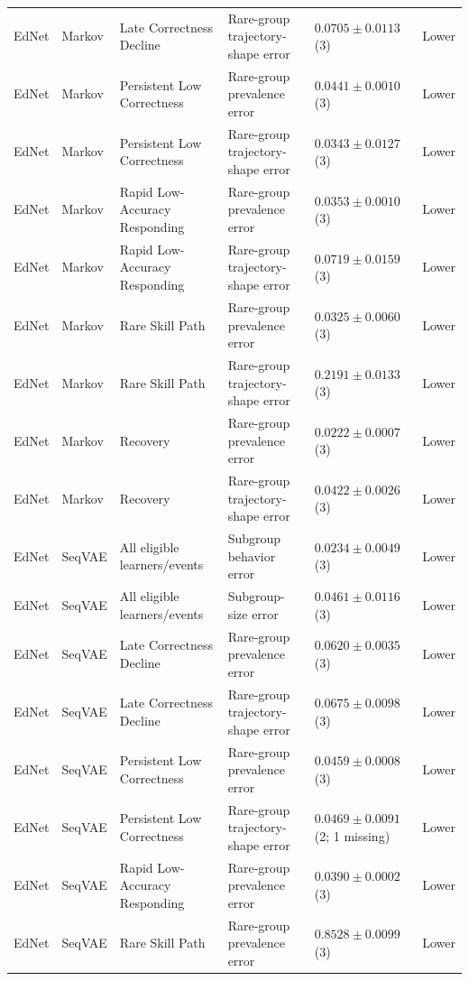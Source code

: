 \begin{longtable}{@{}p{2.25cm}p{2.05cm}p{4.7cm}p{5.0cm}p{2.6cm}p{1.25cm}@{}}
EdNet & Markov & Late Correctness Decline & Rare-group trajectory-shape error & $0.0705 \mathbin{\pm} 0.0113$ (3) & Lower \\
EdNet & Markov & Persistent Low Correctness & Rare-group prevalence error & $0.0441 \mathbin{\pm} 0.0010$ (3) & Lower \\
EdNet & Markov & Persistent Low Correctness & Rare-group trajectory-shape error & $0.0343 \mathbin{\pm} 0.0127$ (3) & Lower \\
EdNet & Markov & Rapid Low-Accuracy Responding & Rare-group prevalence error & $0.0353 \mathbin{\pm} 0.0010$ (3) & Lower \\
EdNet & Markov & Rapid Low-Accuracy Responding & Rare-group trajectory-shape error & $0.0719 \mathbin{\pm} 0.0159$ (3) & Lower \\
EdNet & Markov & Rare Skill Path & Rare-group prevalence error & $0.0325 \mathbin{\pm} 0.0060$ (3) & Lower \\
EdNet & Markov & Rare Skill Path & Rare-group trajectory-shape error & $0.2191 \mathbin{\pm} 0.0133$ (3) & Lower \\
EdNet & Markov & Recovery & Rare-group prevalence error & $0.0222 \mathbin{\pm} 0.0007$ (3) & Lower \\
EdNet & Markov & Recovery & Rare-group trajectory-shape error & $0.0422 \mathbin{\pm} 0.0026$ (3) & Lower \\
EdNet & SeqVAE & All eligible learners/events & Subgroup behavior error & $0.0234 \mathbin{\pm} 0.0049$ (3) & Lower \\
EdNet & SeqVAE & All eligible learners/events & Subgroup-size error & $0.0461 \mathbin{\pm} 0.0116$ (3) & Lower \\
EdNet & SeqVAE & Late Correctness Decline & Rare-group prevalence error & $0.0620 \mathbin{\pm} 0.0035$ (3) & Lower \\
EdNet & SeqVAE & Late Correctness Decline & Rare-group trajectory-shape error & $0.0675 \mathbin{\pm} 0.0098$ (3) & Lower \\
EdNet & SeqVAE & Persistent Low Correctness & Rare-group prevalence error & $0.0459 \mathbin{\pm} 0.0008$ (3) & Lower \\
EdNet & SeqVAE & Persistent Low Correctness & Rare-group trajectory-shape error & $0.0469 \mathbin{\pm} 0.0091$ (2; 1 missing) & Lower \\
EdNet & SeqVAE & Rapid Low-Accuracy Responding & Rare-group prevalence error & $0.0390 \mathbin{\pm} 0.0002$ (3) & Lower \\
EdNet & SeqVAE & Rare Skill Path & Rare-group prevalence error & $0.8528 \mathbin{\pm} 0.0099$ (3) & Lower \\

\end{longtable}

